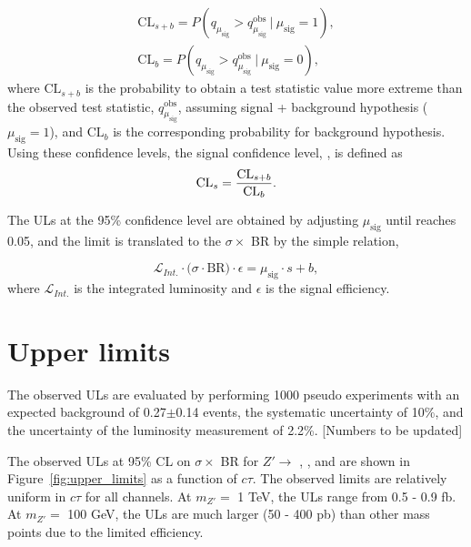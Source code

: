 \begin{align}
\mathrm{CL}_{s+b} = P(q_{\mu_{\mathrm{sig}}} > q_{\mu_{\mathrm{sig}}}^{\mathrm{obs}}~|~\mu_{\mathrm{sig}} = 1), \nonumber \\
\mathrm{CL}_{b} = P(q_{\mu_{\mathrm{sig}}} > q_{\mu_{\mathrm{sig}}}^{\mathrm{obs}}~|~\mu_{\mathrm{sig}} = 0),
\label{eq:p_values}
\end{align}
%
where $\mathrm{CL}_{s+b}$ is the probability to obtain a test statistic value more extreme than the observed test statistic, $q_{\mu_{\mathrm{sig}}}^{\mathrm{obs}}$, assuming signal + background hypothesis ($\mu_{\mathrm{sig}}=1$), and $\mathrm{CL}_{b}$ is the corresponding probability for background hypothesis. Using these confidence levels, the signal confidence level, \CLs, is defined as
\begin{align}
\mathrm{CL}_{s} =  \dfrac{\mathrm{CL}_{s+b}}{\mathrm{CL}_{b}}.
\label{eq:cls}
\end{align}

The ULs at the 95\% confidence level are obtained by adjusting $\mu_{\mathrm{sig}}$ until \CLs reaches 0.05, and the limit is translated to the $\sigma \times$ BR by the simple relation,

\begin{equation}
\label{eq:signal_strength}
\mathcal{L}_{Int.} \cdot \big(\sigma \cdot \mathrm{BR} \big) \cdot \epsilon = \mu_{\mathrm{sig}}\cdot s + b,
\end{equation}
%
where $\mathcal{L}_{Int.}$ is the integrated luminosity and  $\epsilon$ is the signal efficiency.

\section{Upper limits}
The observed ULs are evaluated by performing 1000 pseudo experiments with an expected background of 0.27$\pm$0.14 events, the systematic uncertainty of 10\%, and the uncertainty of the luminosity measurement of 2.2\%. [Numbers to be updated]

The observed ULs at 95\% CL on $\sigma \times$ BR for $Z' \rightarrow$ \mumu, \ee, and \emu are shown in Figure~\ref{fig:upper_limits} as a function of $c\tau$. The observed limits are relatively uniform in $c\tau$ for all channels. At $m_{Z'}=$ 1 TeV, the ULs range from 0.5 - 0.9 fb. At $m_{Z'}=$ 100 GeV, the ULs are much larger (50 - 400 pb) than other mass points due to the limited efficiency.


